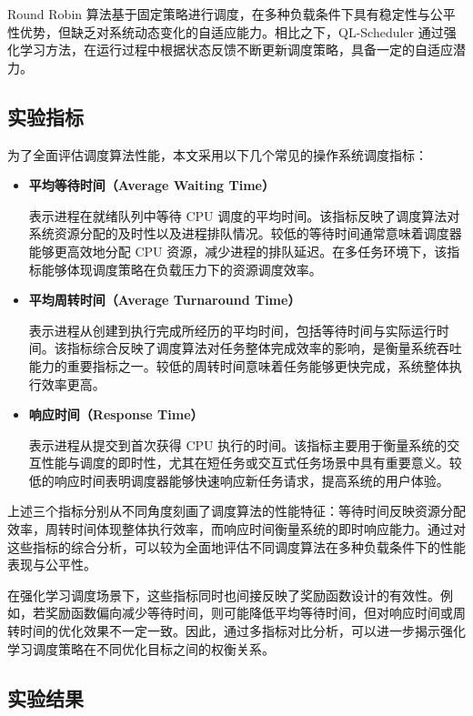 Round Robin 算法基于固定策略进行调度，在多种负载条件下具有稳定性与公平性优势，但缺乏对系统动态变化的自适应能力。相比之下，QL-Scheduler 通过强化学习方法，在运行过程中根据状态反馈不断更新调度策略，具备一定的自适应潜力。


\subsection{实验指标}

为了全面评估调度算法性能，本文采用以下几个常见的操作系统调度指标：

\begin{itemize}

\item \textbf{平均等待时间（Average Waiting Time）}

表示进程在就绪队列中等待 CPU 调度的平均时间。该指标反映了调度算法对系统资源分配的及时性以及进程排队情况。较低的等待时间通常意味着调度器能够更高效地分配 CPU 资源，减少进程的排队延迟。在多任务环境下，该指标能够体现调度策略在负载压力下的资源调度效率。

\item \textbf{平均周转时间（Average Turnaround Time）}

表示进程从创建到执行完成所经历的平均时间，包括等待时间与实际运行时间。该指标综合反映了调度算法对任务整体完成效率的影响，是衡量系统吞吐能力的重要指标之一。较低的周转时间意味着任务能够更快完成，系统整体执行效率更高。

\item \textbf{响应时间（Response Time）}

表示进程从提交到首次获得 CPU 执行的时间。该指标主要用于衡量系统的交互性能与调度的即时性，尤其在短任务或交互式任务场景中具有重要意义。较低的响应时间表明调度器能够快速响应新任务请求，提高系统的用户体验。

\end{itemize}

上述三个指标分别从不同角度刻画了调度算法的性能特征：等待时间反映资源分配效率，周转时间体现整体执行效率，而响应时间衡量系统的即时响应能力。通过对这些指标的综合分析，可以较为全面地评估不同调度算法在多种负载条件下的性能表现与公平性。

在强化学习调度场景下，这些指标同时也间接反映了奖励函数设计的有效性。例如，若奖励函数偏向减少等待时间，则可能降低平均等待时间，但对响应时间或周转时间的优化效果不一定一致。因此，通过多指标对比分析，可以进一步揭示强化学习调度策略在不同优化目标之间的权衡关系。

\subsection{实验结果}

